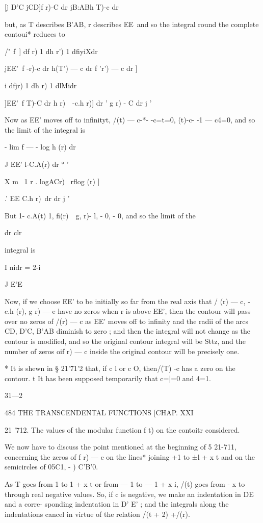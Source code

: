 [j D'C jCD]f r)-C dr jB:ABh T)-c dr

but, as T describes B'AB, r describes EE\ and so the integral round
the complete contoui* reduces to

/" f\ ] df r) 1 dh r') 1 dfiyiXdr

jEE'\ f -r)-c dr h(T') — c dr f 'r') — c dr ]

 i dfjr) 1 dh r) 1 dlMidr

]EE'\ f T)-C dr h r)\ \ -c.h r)] dr ' g r) - C dr j '

Now as EE' moves off to infinityt, /(t) — c-*- -c=t=0, (t)-c- -1 —
c4=0, and so the limit of the integral is

- lim f — - log h (r) dr

J EE' l-C.A(r) dr ° '

 X m \ 1 r . logACr) \ rflog (r) ]

.' EE C.h r)\ dr dr j '

But 1- c.A(t) 1, fi(r)~ \,g, r)- l, - 0, - 0, and so the limit of the

dr clr

integral is

I nidr = 2-i

J E'E

Now, if we choose EE' to be initially so far from the real axis that /
(r) — c, - c.h (r), g r) — e have no zeros when r is above EE', then
the contour will pass over no zeros of /(r) — c as EE' moves off to
infinity and the radii of the arcs CD, D'C, B'AB diminish to zero ;
and then the integral will not change as the contour is modified, and
so the original contour integral will be Sttz, and the number of zeros
oif r) — c inside the original contour will be precisely one.

* It is shewn in § 21'71'2 that, if c l or c O, then/(T) -c has a zero
on the contour. t It has been supposed temporarily that c=|=0 and 4=1.

31—2

484 THE TRANSCENDENTAL FUNCTIONS [CHAP. XXI

21 '712. The values of the modular function f t) on the contoitr
considered.

We now have to discuss the point mentioned at the beginning of 5
21-711, concerning the zeros of f r) — c on the lines* joining +1 to
±l + x t and on the semicircles of 05C1, - ) C'B'0.

As T goes from 1 to 1 + x t or from — 1 to — 1 + x i, /(t) goes from -
x to through real negative values. So, if c is negative, we make an
indentation in DE and a corre- sponding indentation in D' E' ; and the
integrals along the indentations cancel in virtue of the relation /(t
+ 2) +/(r).

